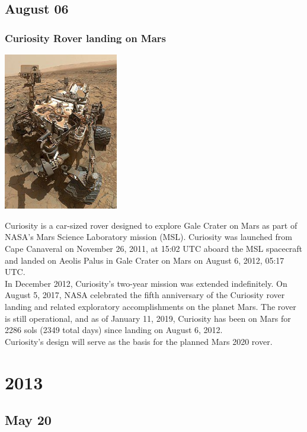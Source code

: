 \documentclass[11pt]{report}
\begin{document}
\section{August 06}
\subsection{Curiosity Rover landing on Mars}
\vspace{2mm}\begin{center}\includegraphics[width=5cm]{./img/curiosityRover.jpg}\end{center}
Curiosity is a car-sized rover designed to explore Gale Crater on Mars as part of NASA's Mars Science Laboratory mission (MSL). Curiosity was launched from Cape Canaveral on November 26, 2011, at 15:02 UTC aboard the MSL spacecraft and landed on Aeolis Palus in Gale Crater on Mars on August 6, 2012, 05:17 UTC.\\
\indent In December 2012, Curiosity's two-year mission was extended indefinitely. On August 5, 2017, NASA celebrated the fifth anniversary of the Curiosity rover landing and related exploratory accomplishments on the planet Mars. The rover is still operational, and as of January 11, 2019, Curiosity has been on Mars for 2286 sols (2349 total days) since landing on August 6, 2012.\\
\indent Curiosity's design will serve as the basis for the planned Mars 2020 rover.

\chapter{2013}
\section{May 20}
\end{document}
